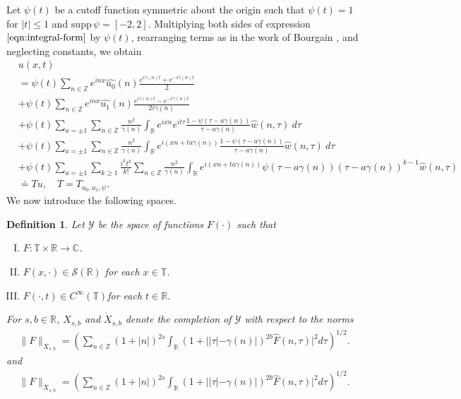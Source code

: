 \documentclass[12pt,reqno]{amsart}
\numberwithin{equation}{section}  %
\renewcommand{\cref}{\Cref}
\newcommand{\rr}{\mathbb{R}}
\newcommand{\zz}{\mathbb{Z}}
\newcommand{\cc}{\mathbb{C}}
\newcommand{\ci}{\mathbb{T}}
\newcommand{\zzdot}{\dot{\zz}}
\newcommand{\wh}{\widehat}
\newtheorem{definition}[theorem]{Definition}
\begin{document}
%
%
Let $\psi(t)$ be a cutoff function symmetric about the 
origin such that $\psi(t) = 1$ for $|t| \le 1$ and $\text{supp} \, \psi 
= [-2, 2 ]$.
Multiplying both sides of expression
$\cref{eqn:integral-form}$ by $\psi(t)$, rearranging terms as in the work of Bourgain \cite{Bourgain-Fourier-transfo}, and neglecting constants, we obtain
%
%
%
%
%
\begin{align}
  & u(x,t)
  \label{main1-rel-term-0}
  \\
  \label{main1-rel-term-1}
  & = \psi(t) \sum_{n \in \zz} e^{inx} \wh{u_{0}}(n) \frac{e^{i\gamma(n)t} + e^{-i\gamma(n)t}}{2} 
  \\
  \label{main1-rel-term-2}
  & + \psi(t) \sum_{n \in \zz} e^{inx}
  \wh{u_{1}}(n)\frac{e^{i\gamma(n)t} - e^{-i\gamma(n)t}}{2 i \gamma(n)} 
  \\
  \label{main1-rel-term-3}
  & +  \psi(t)\sum_{a = \pm 1} \sum_{n\in \zz} \frac{n^{2}}{\gamma(n)}\int_\rr e^{ixn}  
  e^{it \tau} \frac{1 - \psi(\tau -  a\gamma(n)) 
}{\tau -  a\gamma(n)} \wh{w}(n, \tau) \ d \tau
  \\
  \label{main1-rel-term-4}
  & + \psi(t) \sum_{a = \pm 1} \sum_{n\in \zz} \frac{n^{2}}{\gamma(n)}\int_\rr e^{i(xn + 
  t a\gamma(n))}
  \frac{1- \psi(\tau -  a\gamma(n))}{\tau -  a\gamma(n)} \wh{w}(n, \tau) \ d \tau
  \\
  \label{main1-rel-term-4.5}
  & +  \psi(t) \sum_{a = \pm 1}  \sum_{k \ge 1} \frac{i^k t^k}{k!}
  \sum_{n \in \zz} \frac{n^{2}}{\gamma(n)}\int_\rr e^{i(xn + t a\gamma(n) )}
  \psi(\tau -  a\gamma(n)) (\tau -  a\gamma(n))^{k-1} \wh{w}(n, \tau)
  \\
  \label{main1-rel-term-5}
  & \doteq Tu, \quad T=T_{u_0, u_1, \psi}.
\end{align}
%
%
%
%
%
%
%
%
%
%
%
%
We now introduce the following spaces. 
%
%
\begin{definition}
  Let $\mathcal{Y}$ be the space of functions $F(\cdot)$ such that
  \begin{enumerate}[(I)]
   \item{$F: \ci \times \rr \to \cc$}.
   \item{$F(x, \cdot) \in \mathcal{S}(\rr)$ for each $x \in \ci$}.
   \item{$F(\cdot, t) \in C^{\infty}(\ci)$for each $t \in \rr$}.
  \end{enumerate}
  For $s, b \in \rr$, $X_{s,b}$ and $\dot{X}_{s,b}$ denote the completion of $\mathcal{Y}$ with
  respect to the norms
  \begin{equation}
  \begin{split}
    \|F\|_{X_{s,b}} = \left( \sum_{n \in \zz} (1 + |n|)^{2s} \int_{\rr}
    (1 + ||\tau| - \gamma(n) |)^{2b} \wh{F}(n, \tau)|^{2} d \tau\right)^{1/2}.
  \end{split}
  \label{eqn:bous-norm}
  \end{equation}
  and 
  \begin{equation*}
  \begin{split}
    \|F\|_{\dot{X}_{s,b}} = \left( \sum_{n \in \zzdot} (1 + |n|)^{2s} \int_{\rr}
    (1 + ||\tau| - \gamma(n) |)^{2b} \wh{F}(n, \tau)|^{2} d \tau\right)^{1/2}.
  \end{split}
  \end{equation*}
\end{definition}
\end{document}
